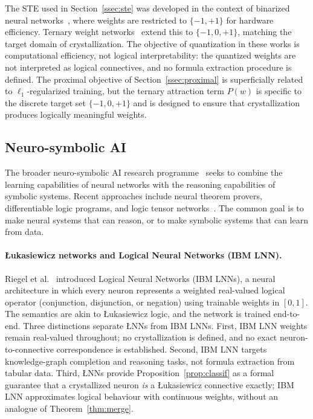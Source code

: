 \documentclass[12pt,a4paper]{article}
\newcommand{\LNN}{\L{}NN}
\begin{document}
The STE used in Section~\ref{ssec:ste} was developed in the context of
binarized neural networks~\cite{bengio2013,courbariaux2016}, where weights are
restricted to $\{-1, +1\}$ for hardware efficiency.
Ternary weight networks~\cite{li2016} extend this to $\{-1, 0, +1\}$,
matching the target domain of crystallization.
The objective of quantization in these works is computational efficiency,
not logical interpretability: the quantized weights are not interpreted as
logical connectives, and no formula extraction procedure is defined.
The proximal objective of Section~\ref{ssec:proximal} is superficially related
to $\ell_1$-regularized training, but the ternary attraction term $P(w)$
is specific to the discrete target set $\{-1, 0, +1\}$ and is designed to
ensure that crystallization produces logically meaningful weights.

\subsection{Neuro-symbolic AI}

The broader neuro-symbolic AI research programme~\cite{garcez2019,garcez2023}
seeks to combine the learning capabilities of neural networks with the
reasoning capabilities of symbolic systems.
Recent approaches include neural theorem provers, differentiable logic
programs, and logic tensor networks~\cite{hitzler2004}.
The common goal is to make neural systems that can reason, or to make symbolic
systems that can learn from data.

\paragraph{\L{}ukasiewicz networks and Logical Neural Networks (IBM LNN).}
Riegel et al.~\cite{riegel2020} introduced Logical Neural Networks (IBM LNNs),
a neural architecture in which every neuron represents a weighted real-valued
logical operator (conjunction, disjunction, or negation) using trainable
weights in $[0,1]$.
The semantics are akin to \L{}ukasiewicz logic, and the network is trained
end-to-end.
Three distinctions separate \LNN{}s from IBM LNNs.
First, IBM LNN weights remain real-valued throughout; no crystallization is
defined, and no exact neuron-to-connective correspondence is established.
Second, IBM LNN targets knowledge-graph completion and reasoning tasks, not
formula extraction from tabular data.
Third, \LNN{}s provide Proposition~\ref{prop:classif} as a formal guarantee
that a crystallized neuron \emph{is} a \L{}ukasiewicz connective exactly;
IBM LNN approximates logical behaviour with continuous weights, without an
analogue of Theorem~\ref{thm:merge}.
\end{document}
